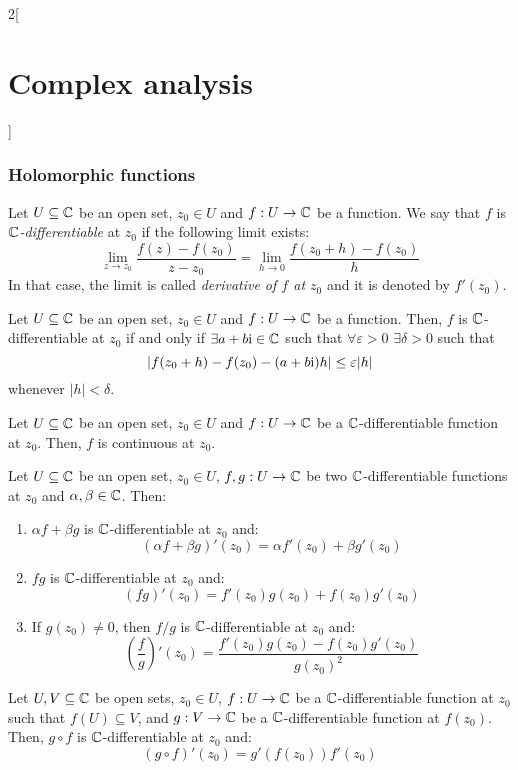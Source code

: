 \documentclass[../../../main_math.tex]{subfiles}
\begin{document}
\begin{multicols}{2}[\section{Complex analysis}]
  \subsubsection{Holomorphic functions}
  \begin{definition}
    Let $U\subseteq \mathbb{C}$ be an open set, $z_0\in U$ and $f:U\rightarrow \mathbb{C}$ be a function. We say that $f$ is \emph{$\mathbb{C}$-differentiable} at $z_0$ if the following limit exists: $$\lim_{z \to z_0} \frac{f(z) - f(z_0)}{z - z_0} = \lim_{h \to 0} \frac{f(z_0 + h) - f(z_0)}{h}$$ In that case, the limit is called \emph{derivative of $f$ at $z_0$} and it is denoted by $f'(z_0)$.
  \end{definition}
  \begin{proposition}
    Let $U\subseteq \mathbb{C}$ be an open set, $z_0\in U$ and $f:U\rightarrow \mathbb{C}$ be a function. Then, $f$ is $\mathbb{C}$-differentiable at $z_0$ if and only if $\exists a+b\mathrm{i}\in\mathbb{C}$ such that $\forall\varepsilon>0$ $\exists\delta>0$ such that $$|f(z_0+h)-f(z_0)-(a+b\mathrm{i})h|\leq \varepsilon \abs{h}$$ whenever $|h|<\delta$.
  \end{proposition}
  \begin{proposition}
    Let $U\subseteq \mathbb{C}$ be an open set, $z_0 \in U$ and $f:U\rightarrow \mathbb{C}$ be a $\mathbb{C}$-differentiable function at $z_0$. Then, $f$ is continuous at $z_0$.
  \end{proposition}
  \begin{proposition}
    Let $U\subseteq \mathbb{C}$ be an open set, $z_0 \in U$, $f,g:U\rightarrow \mathbb{C}$ be two $\mathbb{C}$-differentiable functions at $z_0$ and $\alpha,\beta\in \mathbb{C}$. Then:
    \begin{enumerate}
      \item $\alpha f + \beta g$ is $\mathbb{C}$-differentiable at $z_0$ and: $${(\alpha f+ \beta g)}'(z_0) = \alpha f'(z_0) + \beta g'(z_0)$$
      \item $fg$ is $\mathbb{C}$-differentiable at $z_0$ and: $${(fg)}'(z_0) = f'(z_0)g(z_0) + f(z_0)g'(z_0)$$
      \item If $g(z_0) \neq 0$, then $f/g$ is $\mathbb{C}$-differentiable at $z_0$ and:
            $${\left(\frac{f}{g}\right)}'(z_0) = \frac{f'(z_0)g(z_0) - f(z_0) g'(z_0)}{{g(z_0)}^2}$$
    \end{enumerate}
  \end{proposition}
  \begin{theorem}
    Let $U,V\subseteq \mathbb{C}$ be open sets, $z_0\in U$, $f:U\rightarrow\mathbb{C}$ be a $\mathbb{C}$-differentiable function at $z_0$ such that $f(U)\subseteq V$, and $g:V\rightarrow\mathbb{C}$ be a $\mathbb{C}$-differentiable function at $f(z_0)$. Then, $g\circ f$ is $\mathbb{C}$-differentiable at $z_0$ and: $${(g\circ f)}'(z_0)=g'(f(z_0))f'(z_0)$$

\end{theorem}
\end{multicols}
\end{document}

